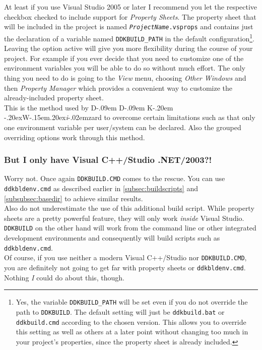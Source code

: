 \documentclass[a4paper,titlepage]{report}
\def\ddkwiz{D\kern-.09em D\kern-.09em K\kern-.20em \raise-.20ex\hbox{W}\kern-.15em\raise.20ex\hbox{\it{i}}\kern-.02em{zard}}
\begin{document}
At least if you use Visual Studio 2005 or later I recommend you let the respective checkbox
checked to include support for \emph{Property Sheets}. The property sheet that will
be included in the project is named \texttt{\emph{ProjectName}.vsprops} and contains
just the declaration of a variable named \texttt{DDKBUILD\_PATH} in the default
configuration\footnote{Yes, the variable \texttt{DDKBUILD\_PATH} will be set even
if you do not override the path to \texttt{DDKBUILD}. The default setting will
just be \texttt{ddkbuild.bat} or \texttt{ddkbuild.cmd} according to the chosen
version. This allows you to override this setting as well as others at a later
point without changing too much in your project's properties, since the property
sheet is already included.}.\\

Leaving the option active will give you more
flexibility during the course of your project. For example if you ever decide
that you need to customize one of the environment variables you will be able
to do so without much effort. The only thing you need to do is going to the
\emph{View} menu, choosing \emph{Other Windows} and then \emph{Property Manager}
which provides a convenient way to customize the already-included property sheet.\\

This is the method used by \ddkwiz{} to overcome certain limitations such as
that only one environment variable per user/system can be declared. Also the
grouped overriding options work through this method.

\subsubsection{But I only have Visual C++/Studio .NET/2003?!}
Worry not. Once again \texttt{DDKBUILD.CMD} comes to the rescue. You can use \texttt{ddkbldenv.cmd}
as described earlier in \autoref{subsec:buildscripts} and \autoref{subsubsec:basedir} to achieve
similar results.\\
Also do not underestimate the use of this additional build script. While property sheets
are a pretty powerful feature, they will only work \emph{inside} Visual Studio.
\texttt{DDKBUILD} on the other hand will work from the command line or other integrated
development environments and consequently will build scripts such as \texttt{ddkbldenv.cmd}.\\

Of course, if you use neither a modern Visual C++/Studio nor \texttt{DDKBUILD.CMD}, you are
definitely not going to get far with property sheets or \texttt{ddkbldenv.cmd}. Nothing \emph{I}
could do about this, though.
\end{document}
